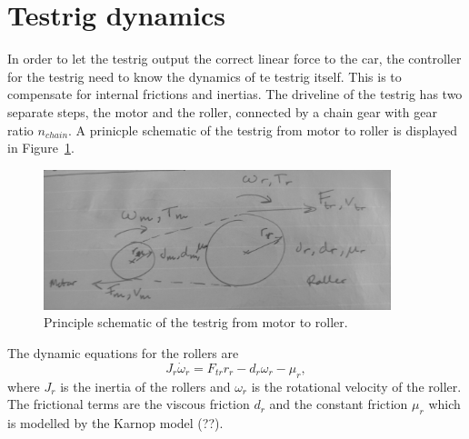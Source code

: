 \section{Testrig dynamics}
In order to let the testrig output the correct linear force to the car, the
controller for the testrig need to know the dynamics of te testrig itself. This
is to compensate for internal frictions and inertias. The driveline of the
testrig has two separate steps, the motor and the roller, connected by a chain
gear with gear ratio $n_{chain}$. A prinicple schematic of the testrig from
motor to roller is displayed in Figure~\ref{fig:testrig_testrigdynamics}.
\begin{figure}[H]
    \label{fig:testrig_testrigdynamics}
    \centering
    \includegraphics[width=0.9\textwidth]{./img/testrig_testrigdynamics.png}
    \caption{Principle schematic of the testrig from motor to roller.}
\end{figure}
The dynamic equations for the rollers are
\begin{equation} \label{eq:testrig_rollerdynamics}
    J_r \dot{\omega}_r = F_{tr}r_r - d_r \omega_r - \mu_r,
\end{equation}
where $J_r$ is the inertia of the rollers and $\omega_r$ is the rotational velocity
of the roller. The frictional terms are the viscous friction $d_r$ and the
constant friction $\mu_r$ which is modelled by the Karnop model (??). 

